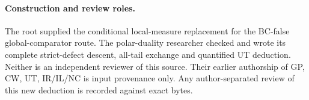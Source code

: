 \paragraph{Construction and review roles.}
The root supplied the conditional local-measure replacement for
the BC-false global-comparator route. The polar-duality researcher
checked and wrote its complete strict-defect descent, all-tail
exchange and quantified UT deduction. Neither is an independent
reviewer of this source. Their earlier authorship of GP, CW,
UT, IR/IL/NC is input provenance only. Any author-separated
review of this new deduction is recorded against exact bytes.

